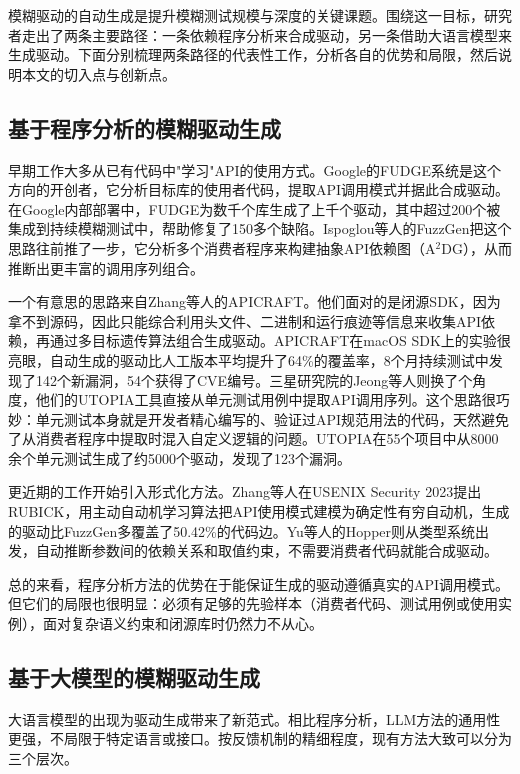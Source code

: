 模糊驱动的自动生成是提升模糊测试规模与深度的关键课题。围绕这一目标，研究者走出了两条主要路径：一条依赖程序分析来合成驱动，另一条借助大语言模型来生成驱动。下面分别梳理两条路径的代表性工作，分析各自的优势和局限，然后说明本文的切入点与创新点。

\subsection{基于程序分析的模糊驱动生成}

早期工作大多从已有代码中"学习"API的使用方式。Google的FUDGE系统\cite{babic2019}是这个方向的开创者，它分析目标库的使用者代码，提取API调用模式并据此合成驱动。在Google内部部署中，FUDGE为数千个库生成了上千个驱动，其中超过200个被集成到持续模糊测试中，帮助修复了150多个缺陷。Ispoglou等人的FuzzGen\cite{ispoglou2020}把这个思路往前推了一步，它分析多个消费者程序来构建抽象API依赖图（A$^2$DG），从而推断出更丰富的调用序列组合。

一个有意思的思路来自Zhang等人的APICRAFT\cite{zhang2021}。他们面对的是闭源SDK，因为拿不到源码，因此只能综合利用头文件、二进制和运行痕迹等信息来收集API依赖，再通过多目标遗传算法组合生成驱动。APICRAFT在macOS SDK上的实验很亮眼，自动生成的驱动比人工版本平均提升了64\%的覆盖率，8个月持续测试中发现了142个新漏洞，54个获得了CVE编号。三星研究院的Jeong等人则换了个角度，他们的UTOPIA工具\cite{jeong2023}直接从单元测试用例中提取API调用序列。这个思路很巧妙：单元测试本身就是开发者精心编写的、验证过API规范用法的代码，天然避免了从消费者程序中提取时混入自定义逻辑的问题。UTOPIA在55个项目中从8000余个单元测试生成了约5000个驱动，发现了123个漏洞。

更近期的工作开始引入形式化方法。Zhang等人在USENIX Security 2023提出RUBICK\cite{zhang2023}，用主动自动机学习算法把API使用模式建模为确定性有穷自动机，生成的驱动比FuzzGen多覆盖了50.42\%的代码边。Yu等人的Hopper\cite{yu2024}则从类型系统出发，自动推断参数间的依赖关系和取值约束，不需要消费者代码就能合成驱动。

总的来看，程序分析方法的优势在于能保证生成的驱动遵循真实的API调用模式。但它们的局限也很明显：必须有足够的先验样本（消费者代码、测试用例或使用实例），面对复杂语义约束和闭源库时仍然力不从心。

\subsection{基于大模型的模糊驱动生成}

大语言模型的出现为驱动生成带来了新范式。相比程序分析，LLM方法的通用性更强，不局限于特定语言或接口。按反馈机制的精细程度，现有方法大致可以分为三个层次。

